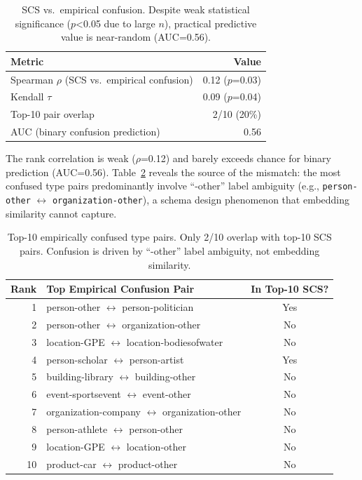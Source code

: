 \documentclass[11pt,a4paper]{article}
\begin{document}
\begin{table}[h]
\centering
\small
\begin{tabular}{lr}
\toprule
Metric & Value \\
\midrule
Spearman $\rho$ (SCS vs.\ empirical confusion) & 0.12 ($p$=0.03) \\
Kendall $\tau$ & 0.09 ($p$=0.04) \\
Top-10 pair overlap & 2/10 (20\%) \\
AUC (binary confusion prediction) & 0.56 \\
\bottomrule
\end{tabular}
\caption{SCS vs.\ empirical confusion. Despite weak statistical significance ($p$<0.05 due to large $n$), practical predictive value is near-random (AUC=0.56).}
\label{tab:scs_validation}
\end{table}

The rank correlation is weak ($\rho$=0.12) and barely exceeds chance for binary prediction (AUC=0.56).
Table~\ref{tab:mismatch} reveals the source of the mismatch: the most confused type pairs predominantly involve ``-other'' label ambiguity (e.g., \texttt{person-other} $\leftrightarrow$ \texttt{organization-other}), a schema design phenomenon that embedding similarity cannot capture.

\begin{table}[h]
\centering
\small
\begin{tabular}{rlc}
\toprule
Rank & Top Empirical Confusion Pair & In Top-10 SCS? \\
\midrule
1 & person-other $\leftrightarrow$ person-politician & Yes \\
2 & person-other $\leftrightarrow$ organization-other & No \\
3 & location-GPE $\leftrightarrow$ location-bodiesofwater & No \\
4 & person-scholar $\leftrightarrow$ person-artist & Yes \\
5 & building-library $\leftrightarrow$ building-other & No \\
6 & event-sportsevent $\leftrightarrow$ event-other & No \\
7 & organization-company $\leftrightarrow$ organization-other & No \\
8 & person-athlete $\leftrightarrow$ person-other & No \\
9 & location-GPE $\leftrightarrow$ location-other & No \\
10 & product-car $\leftrightarrow$ product-other & No \\
\bottomrule
\end{tabular}
\caption{Top-10 empirically confused type pairs. Only 2/10 overlap with top-10 SCS pairs. Confusion is driven by ``-other'' label ambiguity, not embedding similarity.}
\label{tab:mismatch}
\end{table}
\end{document}

